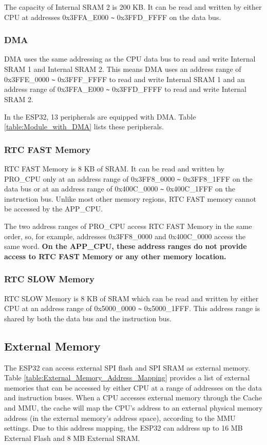 \documentclass[main\_\_EN.tex]{subfiles}
\begin{document}
The capacity of Internal SRAM 2 is 200 KB. It can be read and written by either CPU at addresses 0x3FFA\_E000 \verb+~+ 0x3FFD\_FFFF on the data bus.


\subsubsection{DMA}
\label{paragraph: DMA}
\hypertarget{DMA}{}
DMA uses the same addressing as the CPU data bus to read and write Internal SRAM 1 and Internal SRAM 2. This means DMA uses an address range of 0x3FFE\_0000 \verb+~+ 0x3FFF\_FFFF to read and write Internal SRAM 1 and an address range of 0x3FFA\_E000 \verb+~+ 0x3FFD\_FFFF to read and write Internal SRAM 2.

In the ESP32, 13 peripherals are equipped with DMA. Table \ref{table:Module_with_DMA} lists these peripherals.




\subsubsection{RTC FAST Memory}

\hypertarget{PRO_CPU_Only}{}
RTC FAST Memory is 8 KB of SRAM. It can be read and written by PRO\_CPU only at an address range of 0x3FF8\_0000 \verb+~+ 0x3FF8\_1FFF on the data bus or at an address range of 0x400C\_0000 \verb+~+ 0x400C\_1FFF on the instruction bus. Unlike most other memory regions, RTC FAST memory cannot be accessed by the APP\_CPU.

The two address ranges of PRO\_CPU access RTC FAST Memory in the same order, so, for example, addresses 0x3FF8\_0000 and 0x400C\_0000 access the same word. \textbf{On the APP\_CPU, these address ranges do not provide access to RTC FAST Memory or any other memory location.}

\subsubsection{RTC SLOW Memory}

RTC SLOW Memory is 8 KB of SRAM which can be read and written by either CPU at an address range of 0x5000\_0000 \verb+~+ 0x5000\_1FFF. This address range is shared by both the data bus and the instruction bus.


\subsection{External Memory}
The ESP32 can access external SPI flash and SPI SRAM as external memory. Table \ref{table:External_Memory_Address_Mapping} provides a list of external memories that can be accessed by either CPU at a range of addresses on the data and instruction buses. When a CPU accesses external memory through the Cache and MMU, the cache will map the CPU's address to an external physical memory address (in the external memory's address space), according to the MMU settings. Due to this address mapping, the ESP32 can address up to 16 MB External Flash and 8 MB External SRAM.
\end{document}
